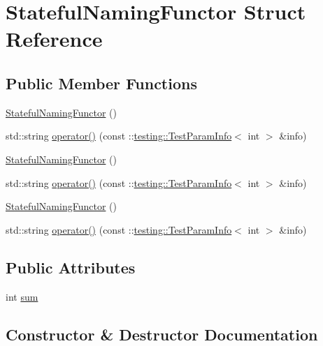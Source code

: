 \hypertarget{struct_stateful_naming_functor}{}\section{Stateful\+Naming\+Functor Struct Reference}
\label{struct_stateful_naming_functor}
\subsection*{Public Member Functions}
\begin{DoxyCompactItemize}
\item 
\mbox{\hyperlink{struct_stateful_naming_functor_a5ad1bfb327a44d58aafa96e4e2490a36}{Stateful\+Naming\+Functor}} ()
\item 
std\+::string \mbox{\hyperlink{struct_stateful_naming_functor_a6a1d07c0b8314c1aee535f269ea536db}{operator()}} (const \+::\mbox{\hyperlink{structtesting_1_1_test_param_info}{testing\+::\+Test\+Param\+Info}}$<$ int $>$ \&info)
\item 
\mbox{\hyperlink{struct_stateful_naming_functor_a5ad1bfb327a44d58aafa96e4e2490a36}{Stateful\+Naming\+Functor}} ()
\item 
std\+::string \mbox{\hyperlink{struct_stateful_naming_functor_a6a1d07c0b8314c1aee535f269ea536db}{operator()}} (const \+::\mbox{\hyperlink{structtesting_1_1_test_param_info}{testing\+::\+Test\+Param\+Info}}$<$ int $>$ \&info)
\item 
\mbox{\hyperlink{struct_stateful_naming_functor_a5ad1bfb327a44d58aafa96e4e2490a36}{Stateful\+Naming\+Functor}} ()
\item 
std\+::string \mbox{\hyperlink{struct_stateful_naming_functor_a6a1d07c0b8314c1aee535f269ea536db}{operator()}} (const \+::\mbox{\hyperlink{structtesting_1_1_test_param_info}{testing\+::\+Test\+Param\+Info}}$<$ int $>$ \&info)
\end{DoxyCompactItemize}
\subsection*{Public Attributes}
\begin{DoxyCompactItemize}
\item 
int \mbox{\hyperlink{struct_stateful_naming_functor_a95887cf031d3113ae2edcd7617af3b79}{sum}}
\end{DoxyCompactItemize}


\subsection{Constructor \& Destructor Documentation}
\mbox{\label{struct_stateful_naming_functor_a5ad1bfb327a44d58aafa96e4e2490a36}} 
